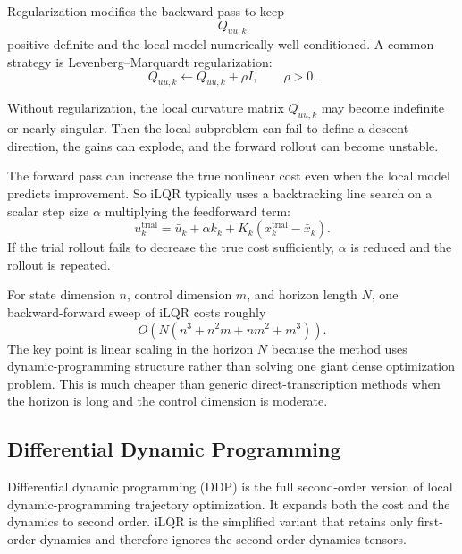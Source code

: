 \begin{definition}[Regularization]\label{def:l8-regularization}
	Regularization modifies the backward pass to keep
	\[
		Q_{uu,k}
	\]
	positive definite and the local model numerically well conditioned. A common strategy is Levenberg--Marquardt regularization:
	\[
		Q_{uu,k} \leftarrow Q_{uu,k} + \rho I,
		\qquad
		\rho > 0.
	\]
\end{definition}

\begin{remark}
	Without regularization, the local curvature matrix $Q_{uu,k}$ may become indefinite or nearly singular. Then the local subproblem can fail to define a descent direction, the gains can explode, and the forward rollout can become unstable.
\end{remark}

\begin{remark}
	The forward pass can increase the true nonlinear cost even when the local model predicts improvement. So iLQR typically uses a backtracking line search on a scalar step size $\alpha$ multiplying the feedforward term:
	\[
		u_k^{\text{trial}} = \bar u_k + \alpha k_k + K_k(x_k^{\text{trial}}-\bar x_k).
	\]
	If the trial rollout fails to decrease the true cost sufficiently, $\alpha$ is reduced and the rollout is repeated.
\end{remark}

\begin{remark}
	For state dimension $n$, control dimension $m$, and horizon length $N$, one backward-forward sweep of iLQR costs roughly
	\[
		O\!\left(N(n^3+n^2m+nm^2+m^3)\right).
	\]
	The key point is linear scaling in the horizon $N$ because the method uses dynamic-programming structure rather than solving one giant dense optimization problem. This is much cheaper than generic direct-transcription methods when the horizon is long and the control dimension is moderate.
\end{remark}

\subsection{Differential Dynamic Programming}
\label{sec:l8-differential-dynamic-programming}

\begin{definition}\label{def:l8-ddp-versus-ilqr}
	Differential dynamic programming (DDP) is the full second-order version of local dynamic-programming trajectory optimization. It expands both the cost and the dynamics to second order. iLQR is the simplified variant that retains only first-order dynamics and therefore ignores the second-order dynamics tensors.
\end{definition}


